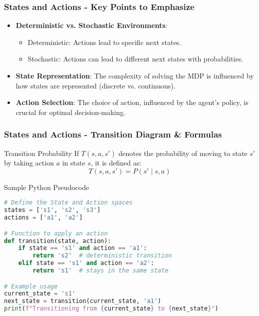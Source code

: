 \documentclass[aspectratio=169]{beamer}
\begin{document}
\begin{frame}[fragile]
    \frametitle{States and Actions - Key Points to Emphasize}
    
    \begin{itemize}
        \item \textbf{Deterministic vs. Stochastic Environments}:
        \begin{itemize}
            \item Deterministic: Actions lead to specific next states.
            \item Stochastic: Actions can lead to different next states with probabilities.
        \end{itemize}
        
        \item \textbf{State Representation}:
        The complexity of solving the MDP is influenced by how states are represented (discrete vs. continuous).
        
        \item \textbf{Action Selection}:
        The choice of action, influenced by the agent's policy, is crucial for optimal decision-making.
    \end{itemize}
\end{frame}

\begin{frame}[fragile]
    \frametitle{States and Actions - Transition Diagram & Formulas}
    
    \begin{block}{Transition Probability}
        If \( T(s, a, s') \) denotes the probability of moving to state \( s' \) by taking action \( a \) in state \( s \), it is defined as:
        \begin{equation}
            T(s, a, s') = P(s' \mid s, a)
        \end{equation}
    \end{block}
    
    \begin{block}{Sample Python Pseudocode}
        \begin{lstlisting}[language=Python]
# Define the State and Action spaces
states = ['s1', 's2', 's3']
actions = ['a1', 'a2']

# Function to apply an action
def transition(state, action):
    if state == 's1' and action == 'a1':
        return 's2'  # deterministic transition
    elif state == 's1' and action == 'a2':
        return 's1'  # stays in the same state

# Example usage
current_state = 's1'
next_state = transition(current_state, 'a1')
print(f"Transitioning from {current_state} to {next_state}")
        \end{lstlisting}
    \end{block}
\end{frame}
\end{document}
